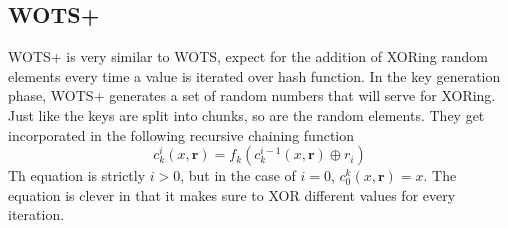 \documentclass[]{scrartcl}
\begin{document}
\subsection*{WOTS+}
WOTS+ is very similar to WOTS, expect for the addition of XORing random elements every time a value is iterated over hash function. In the key generation phase, WOTS+ generates a set of random numbers that will serve for XORing. Just like the keys are split into chunks, so are the random elements. They get incorporated in the following recursive chaining function
\begin{equation}
c_{k}^{i}(x,\textbf{r}) = f_{k}(c_{k}^{i-1}(x,\textbf{r}) \oplus r_{i})
\end{equation}
Th equation is strictly $i > 0$, but in the case of $i = 0$, $c_{0}^{k}(x,\textbf{r}) = x$. The equation is clever in that it makes sure to XOR different values for every iteration. 
\end{document}
